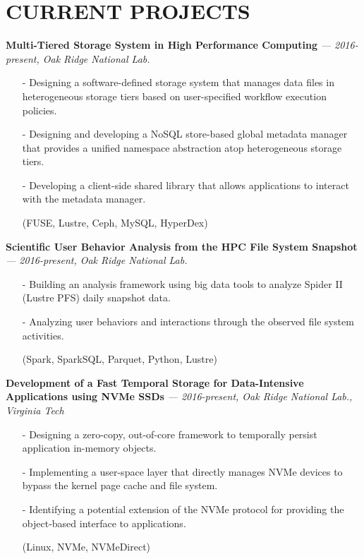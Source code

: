 \section{CURRENT PROJECTS}
\vspace{.03in}
  {\bf Multi-Tiered Storage System in High Performance Computing}
   {\it \footnotesize --- 2016-present, Oak Ridge National Lab.}
   \begin{itemize}[leftmargin=*]
    \setlength\itemsep{-0.02in}
    \item[-] Designing a software-defined storage system that manages data files
	     in heterogeneous storage tiers based on user-specified workflow execution
             policies.
    \item[-] Designing and developing a NoSQL store-based global metadata manager
	     that provides a unified namespace abstraction atop heterogeneous
	     storage tiers.
    \item[-] Developing a client-side shared library that allows applications to interact
             with the metadata manager.
    \item[] {\small(FUSE, Lustre, Ceph, MySQL, HyperDex)}
   \end{itemize}
  \vspace{-0.15in}
  {\bf Scientific User Behavior Analysis from the HPC File System Snapshot}
   {\it \footnotesize --- 2016-present, Oak Ridge National Lab.}
   \begin{itemize}[leftmargin=*]
    \setlength\itemsep{-0.02in}
    \item[-] Building an analysis framework using big data tools to analyze Spider II (Lustre PFS) daily snapshot data.
    \item[-] Analyzing user behaviors and interactions through the observed file system activities.
    \item[] {\small(Spark, SparkSQL, Parquet, Python, Lustre)}
   \end{itemize}
  \vspace{-0.15in}
  {\bf Development of a Fast Temporal Storage for Data-Intensive Applications using NVMe SSDs}
   {\it \footnotesize --- 2016-present, Oak Ridge National Lab., Virginia Tech}
   \begin{itemize}[leftmargin=*]
    \setlength\itemsep{-0.02in}
    \item[-] Designing a zero-copy, out-of-core framework to temporally persist 
             application in-memory objects.
    \item[-] Implementing a user-space layer that directly manages NVMe
             devices to bypass the kernel page cache and file system.
    \item[-] Identifying a potential extension of the NVMe protocol for
             providing the object-based interface to applications.
    \item[] {\small(Linux, NVMe, NVMeDirect)}
   \end{itemize}
 
